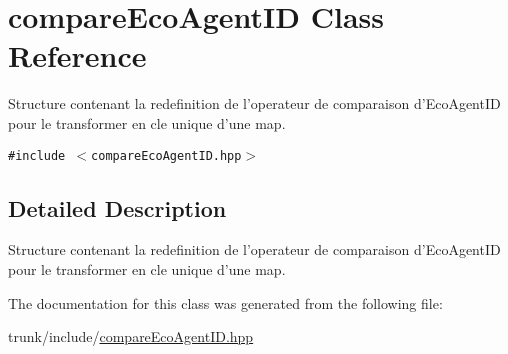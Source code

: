 \hypertarget{structcompareEcoAgentID}{
\section{compareEcoAgentID Class Reference}
\label{structcompareEcoAgentID}
}
Structure contenant la redefinition de l'operateur de comparaison d'EcoAgentID pour le transformer en cle unique d'une map.  


{\tt \#include $<$compareEcoAgentID.hpp$>$}



\subsection{Detailed Description}
Structure contenant la redefinition de l'operateur de comparaison d'EcoAgentID pour le transformer en cle unique d'une map. 

The documentation for this class was generated from the following file:\begin{CompactItemize}
\item 
trunk/include/\hyperlink{compareEcoAgentID_8hpp}{compareEcoAgentID.hpp}\end{CompactItemize}
